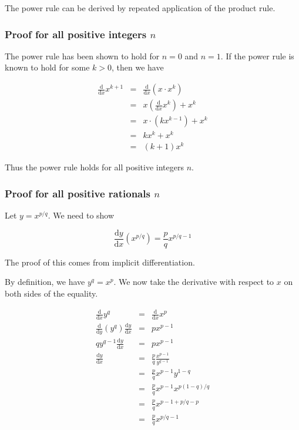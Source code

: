 \documentclass[12pt]{article}
\newcommand{\D}[1]{\ensuremath{\mathrm{d}#1}}
\newcommand{\DDX}{\ensuremath{\frac{\D{}}{\D{x}}}}
\begin{document}
The power rule can be derived by repeated application of the product rule.

\subsubsection*{Proof for all positive integers $n$}

The power rule has been shown to hold for $n = 0$ and $n = 1$.
If the power rule is known to hold for some $k > 0$, then we have

\begin{eqnarray*} 
\DDX x^{k+1}
& = & \DDX (x\cdot x^k) \\
& = & x\left(\DDX x^k\right) + x^k \\
& = & x\cdot(kx^{k-1}) + x^k \\
& = & kx^k + x^k \\
& = & (k + 1)x^k
\end{eqnarray*}

Thus the power rule holds for all positive integers $n$.

\subsubsection*{Proof for all positive rationals $n$}

Let $y = x^{p/q}$.  We need to show

\begin{equation}
\frac{\D{y}}{\D{x}}(x^{p/q}) = \frac{p}{q}x^{p/q-1} \label{prat}
\end{equation}

The proof of this comes from implicit differentiation.

By definition, we have $y^q = x^p$.  We now take the derivative with respect to $x$ on both sides of the equality.

\begin{eqnarray*}
\DDX y^q & = & \DDX x^p \\ 
\frac{\D{}}{\D{y}}(y^q)\frac{\D{y}}{\D{x}} & = & px^{p-1} \\
qy^{q-1}\frac{\D{y}}{\D{x}} & = & px^{p-1} \\
\frac{\D{y}}{\D{x}} & = & \frac{p}{q}\frac{x^{p-1}}{y^{q-1}} \\
&=& \frac{p}{q}x^{p-1}y^{1-q} \\
&=& \frac{p}{q}x^{p-1}x^{p(1-q)/q} \\
&=& \frac{p}{q}x^{p-1+p/q-p} \\
&=& \frac{p}{q}x^{p/q-1}
\end{eqnarray*}
\end{document}
